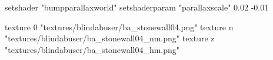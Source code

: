 	setshader "bumpparallaxworld"
	setshaderparam "parallaxscale" 0.02 -0.01

		texture 0 "textures/blindabuser/ba_stonewall04.png"
		texture n "textures/blindabuser/ba_stonewall04_nm.png"
		texture z "textures/blindabuser/ba_stonewall04_hm.png"
